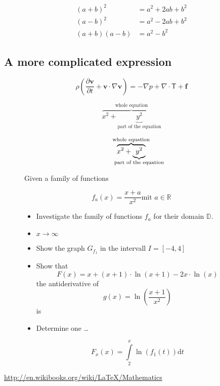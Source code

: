 \documentclass[10pt, a4paper]{article}
\numberwithin{equation}{section}
\numberwithin{figure}{section}
\begin{document}
\begin{align}
  (a+b)^2    &=    a^2+2ab+b^2 \nonumber \\
  (a-b)^2    &=    a^2-2ab+b^2 \nonumber \\
  (a+b)(a-b) &=    a^2-b^2
\end{align}

\subsection{A more complicated expression}
\[ \rho\left( \frac{\partial \mathbf{v}}{\partial t} + \mathbf{v}\cdot\nabla\mathbf{v}\right) = -\nabla p + \nabla\cdot\mathsf{T}+\mathbf{f} \]

\[ \overbrace{x^2 + \underbrace{y^2}_\text{part of the equation}}^\text{whole equation} \]

\[ \overbrace{x^2 + \underbrace{y^2}_{\mathclap{\text{part of the equation}}}}^{{\text{whole equation}}} \]

\begin{figure}[h!]
Given a family of functions

\[ f_a(x) = \frac{x+a}{x^2} \text{mit } a \in \mathbb{R} \]

\begin{itemize}
\item Investigate the family of functions \( f_a \) for their domain \( \mathbb{D} \).
\item \( x \to \infty \)
\item Show the graph \( G_{f_1} \) in the intervall \( I = [-4,4] \)
\item Show that 
\[ F(x) = x+ (x+1)\cdot\ln(x+1)-2x\cdot\ln(x) \]
the antiderivative of \[ g(x) = \ln\left(\dfrac{x+1}{x^2}\right) \] is
\item Determine one \ldots

\[ F_x(x) = \int\limits_2^x\ln\left(f_1(t)\right)\mathrm{d}t \]

\end{itemize}
\end{figure}

\url{http://en.wikibooks.org/wiki/LaTeX/Mathematics}
\end{document}
